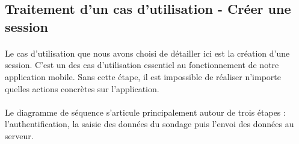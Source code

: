 \documentclass[titlepage, 12pt]{report}
\begin{document}
\clearpage

\subsection{Traitement d'un cas d'utilisation - Créer une session}

\paragraph{}Le cas d'utilisation que nous avons choisi de détailler ici est la création d'une session. C'est un des cas d'utilisation essentiel au fonctionnement de notre application mobile. Sans cette étape, il est impossible de réaliser n'importe quelles actions concrètes sur l'application.
\paragraph{}Le diagramme de séquence s'articule principalement autour de trois étapes : l'authentification, la saisie des données du sondage puis l'envoi des données au serveur.

\end{document}
